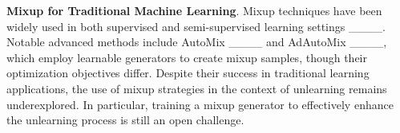 \textbf{Mixup for Traditional Machine Learning}. Mixup techniques have been widely used in both supervised and semi-supervised learning settings ____. Notable advanced methods include AutoMix ____ and AdAutoMix ____, which employ learnable generators to create mixup samples, though their optimization objectives differ. Despite their success in traditional learning applications, the use of mixup strategies in the context of unlearning remains underexplored. In particular, training a mixup generator to effectively enhance the unlearning process is still an open challenge.